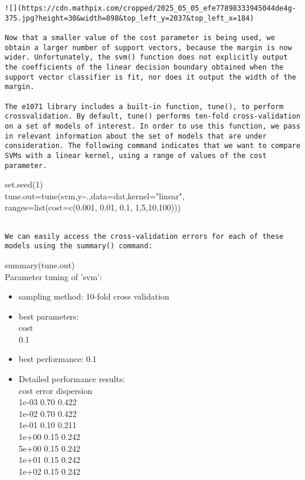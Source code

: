 \documentclass[10pt]{article}
\begin{document}
\begin{verbatim}
![](https://cdn.mathpix.com/cropped/2025_05_05_efe77898333945044de4g-375.jpg?height=30&width=898&top_left_y=2037&top_left_x=184)

Now that a smaller value of the cost parameter is being used, we obtain a larger number of support vectors, because the margin is now wider. Unfortunately, the svm() function does not explicitly output the coefficients of the linear decision boundary obtained when the support vector classifier is fit, nor does it output the width of the margin.

The e1071 library includes a built-in function, tune(), to perform crossvalidation. By default, tune() performs ten-fold cross-validation on a set of models of interest. In order to use this function, we pass in relevant information about the set of models that are under consideration. The following command indicates that we want to compare SVMs with a linear kernel, using a range of values of the cost parameter.
\end{verbatim}

\begin{displayquote}
set.seed(1)\\
tune.out=tune(svm,y\~{}.,data=dat,kernel="linear",\\
ranges=list(cost=c(0.001, 0.01, 0.1, 1,5,10,100)))
\end{displayquote}

\begin{verbatim}

We can easily access the cross-validation errors for each of these models using the summary() command:
\end{verbatim}

\begin{displayquote}
summary(tune.out)\\
Parameter tuning of 'svm':
\end{displayquote}

\begin{itemize}
  \item sampling method: 10-fold cross validation
  \item best parameters:\\
cost\\
0.1
  \item best performance: 0.1
  \item Detailed performance results:\\
cost error dispersion\\
1e-03 0.70 0.422\\
1e-02 0.70 0.422\\
1e-01 0.10 0.211\\
1e+00 0.15 0.242\\
5e+00 0.15 0.242\\
1e+01 0.15 0.242\\
1e+02 0.15 0.242
\end{itemize}
\end{document}

